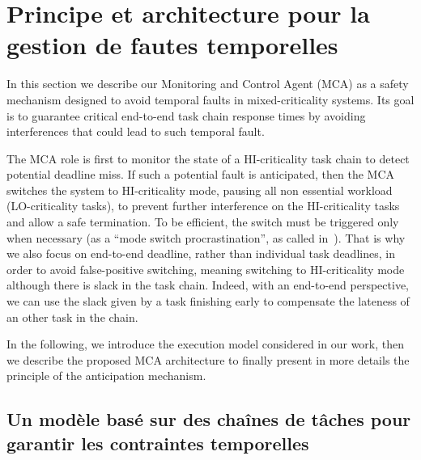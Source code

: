 \documentclass[french, a4paper, 11pt, twoside, pdftex]{StyleThese}
\begin{document}
\setcounter{chapter}{3} %
\dominitoc
\faketableofcontents
\fi

\chapter{Principe et architecture pour la gestion de fautes temporelles} \label{chap:3_PrincipeArchi}
\minitoc

In this section we describe our Monitoring and Control Agent (MCA) as a safety mechanism designed to avoid temporal faults in mixed-criticality systems. Its goal is to guarantee critical end-to-end task chain response times by avoiding interferences that could lead to such temporal fault.

The MCA role is first to monitor the state of a HI-criticality task chain to detect potential deadline miss. If such a potential fault is anticipated, then the MCA switches the system to HI-criticality mode, pausing all non essential workload (LO-criticality tasks), to prevent further interference on the HI-criticality tasks and allow a safe termination. To be efficient, the switch  must be triggered only when necessary (as a “mode switch procrastination”, as called in~\cite{hu_ffob_2019}). That is why we also focus on end-to-end deadline, rather than individual task deadlines, in order to avoid false-positive switching, meaning switching to HI-criticality mode although there is slack in the task chain. Indeed, with an end-to-end perspective, we can use the slack given by a task finishing early to compensate the lateness of an other task in the chain.

In the following, we introduce the execution model considered in our work, then we describe the proposed MCA architecture to finally present in more details the principle of the anticipation mechanism.

\section{Un modèle basé sur des chaînes de tâches pour garantir les contraintes temporelles}

    
\end{document}
